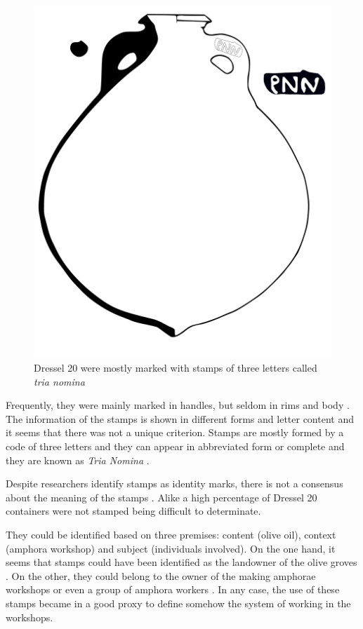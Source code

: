 \documentclass[review]{elsarticle}
\begin{document}
\begin{figure}[htp]
	\centering
\includegraphics[scale=0.5]{figs/dressel20}
\caption{Dressel 20 were mostly marked with stamps of three letters called \textit{tria nomina}}
\label{amphora}
\end{figure} 

Frequently, they were mainly marked in handles, but seldom in rims and body \citep{millet_anforas_1998}. 
The information of the stamps is shown in different forms and letter content and it seems that there was not a unique criterion. Stamps are mostly formed by a code of three letters and they can appear in abbreviated form or complete and they are known as \textit{Tria Nomina} \citep{berni_millet_amphora_1996}. 

Despite researchers identify stamps as identity marks, there is not a consensus about the meaning of the stamps \citep{rodriguez_baetican_1998}. Alike a high percentage of Dressel 20 containers were not stamped being difficult to determinate. 

They could be identified based on three premises: content (olive oil), context (amphora workshop) and subject (individuals involved). On the one hand, it seems that stamps could have been identified as the landowner of the olive groves \citep{rodriguez_economioleicola_1977}. On the other, they could belong to the owner of the making amphorae workshops or even a group of amphora workers \citep{berni_millet_epigrafianforica_2008}. In any case, the use of these stamps became in a good proxy to define somehow the system of working in the workshops. 
\end{document}
